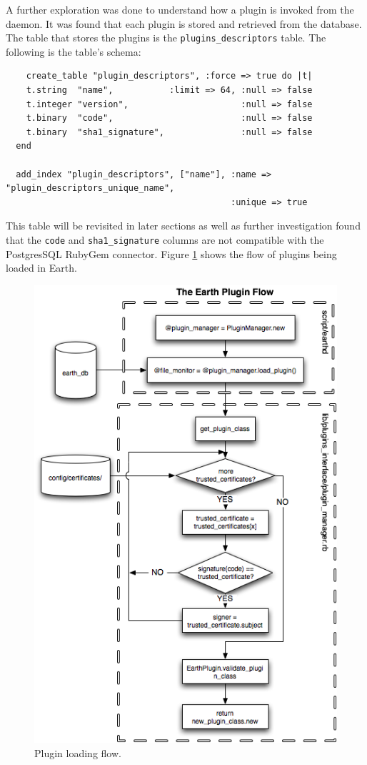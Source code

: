 \documentclass{article}
\begin{document}
A further exploration was done to understand how a plugin is invoked from the daemon. It was found that each plugin is stored and retrieved from the database. The table that stores the plugins is the \texttt{plugins\_descriptors} table. The following is the table's schema:

\begin{verbatim}
    create_table "plugin_descriptors", :force => true do |t|
    t.string  "name",           :limit => 64, :null => false
    t.integer "version",                      :null => false
    t.binary  "code",                         :null => false
    t.binary  "sha1_signature",               :null => false
  end

  add_index "plugin_descriptors", ["name"], :name => "plugin_descriptors_unique_name", 
                                            :unique => true
\end{verbatim}

This table will be revisited in later sections as well as further investigation found that the \texttt{code} and \texttt{sha1\_signature} columns are not compatible with the PostgresSQL RubyGem connector. Figure \ref{fig:flow} shows the flow of plugins being loaded in Earth.

\begin{figure}[ht]
    \centering        
    \includegraphics[scale=0.5]{flow.png}
    \caption{Plugin loading flow.}
    \label{fig:flow}
\end{figure}
\end{document}
